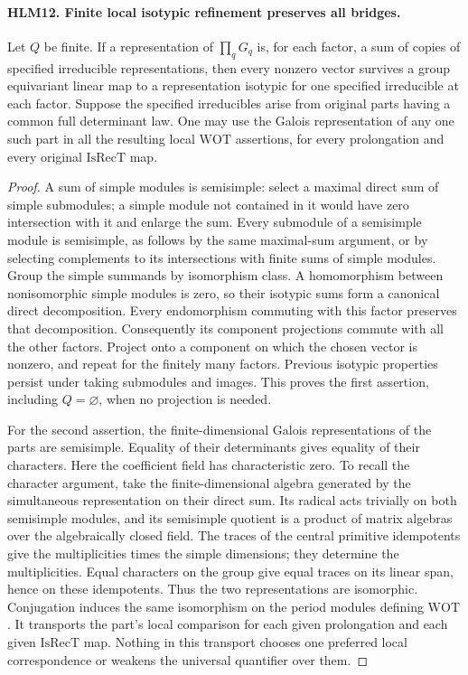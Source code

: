 \documentclass[11pt,a4paper]{article}
\numberwithin{equation}{section}
\theoremstyle{remark}\newtheorem{remark}[theorem]{Remark}
\begin{document}
\paragraph{HLM12. Finite local isotypic refinement preserves all bridges.}
\label{claim:HLM12}
Let \(Q\) be finite.  If a representation of \(\prod_qG_q\)
is, for each factor, a sum of copies of specified irreducible
representations, then every nonzero vector survives a group
equivariant linear map to a representation isotypic for one
specified irreducible at each factor.  Suppose the specified
irreducibles arise from original parts having a common full
determinant law.  One may use the Galois representation of any
one such part in all the resulting local \(\mathrm{WOT}\)
assertions, for every prolongation and every original
\(\mathrm{IsRecT}\) map.
\begin{proof}
A sum of simple modules is semisimple: select a maximal direct
sum of simple submodules; a simple module not contained in it
would have zero intersection with it and enlarge the sum.
Every submodule of a semisimple module is semisimple, as follows
by the same maximal-sum argument, or by selecting complements
to its intersections with finite sums of simple modules.
Group the simple summands by isomorphism class.  A homomorphism
between nonisomorphic simple modules is zero, so their
isotypic sums form a canonical direct decomposition.  Every
endomorphism commuting with this factor preserves that
decomposition.  Consequently its component projections commute
with all the other factors.  Project onto a component on which
the chosen vector is nonzero, and repeat for the finitely many
factors.  Previous isotypic properties persist under taking
submodules and images.  This proves the first assertion,
including \(Q=\varnothing\), when no projection is needed.

For the second assertion, the finite-dimensional Galois
representations of the parts are semisimple.  Equality of their
determinants gives equality of their characters.  Here the
coefficient field has characteristic zero.  To recall the
character argument, take the finite-dimensional algebra generated
by the simultaneous representation on their direct sum.
Its radical acts trivially on both semisimple modules, and its
semisimple quotient is a product of matrix algebras over the
algebraically closed field.  The traces of the central primitive
idempotents give the multiplicities times the simple dimensions;
they determine the multiplicities.  Equal characters on the
group give equal traces on its linear span, hence on these
idempotents.  Thus the two representations are isomorphic.
Conjugation induces the same isomorphism on the period modules
defining \(\mathrm{WOT}\).  It transports the part's local
comparison for each given prolongation and each given
\(\mathrm{IsRecT}\) map.  Nothing in this transport chooses
one preferred local correspondence or weakens the universal
quantifier over them.
\end{proof}
\end{document}
